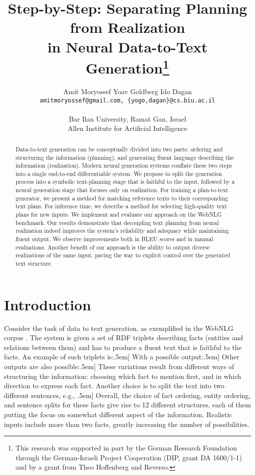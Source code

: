 \documentclass[11pt,a4paper]{article}
\title{
    Step-by-Step: Separating Planning from Realization \\ 
    in Neural Data-to-Text Generation\thanks{\hspace{0.17cm}This research was supported in part by the German Research Foundation through the German-Israeli Project Cooperation (DIP, grant DA 1600/1-1) and by a grant from Theo Hoffenberg and Reverso.}
}
\author{Amit Moryossef \;\; Yoav Goldberg \;\; Ido Dagan \\
\texttt{amitmoryossef@gmail.com, \{yogo,dagan\}@cs.biu.ac.il} \\
\\ Bar Ilan University, Ramat Gan, Israel \\
Allen Institute for Artificial Intelligence
}
\date{}
\begin{document}
\maketitle

\begin{abstract}
Data-to-text generation can be conceptually divided into two parts: ordering and structuring the information (planning), and generating fluent language describing the information (realization). Modern neural generation systems conflate these two steps into a single end-to-end differentiable system. We propose to split the generation process into a symbolic text-planning stage that is faithful to the input, followed by a neural generation stage that focuses only on realization. 
For training a plan-to-text generator, we present a method for matching reference texts to their corresponding text plans. For inference time, we describe a method for selecting high-quality text plans for new inputs. We implement and evaluate our approach on the WebNLG benchmark. Our results demonstrate that decoupling text planning from neural realization indeed improves the system's reliability and adequacy while maintaining fluent output. We observe improvements both in BLEU scores and in manual evaluations. Another benefit of our approach is the ability to output diverse realizations of the same input, paving the way to explicit control over the generated text structure.
\end{abstract}

\thispagestyle{fancy}

\section{Introduction}
Consider the task of data to text generation, as exemplified in the WebNLG corpus \cite{colin2016webnlg}. The system is given a set of RDF triplets describing facts (entities and relations between them) and has to produce a fluent text that is faithful to the facts. An example of such triplets is:\0.5em]
With a possible output:\0.5em]
Other outputs are also possible:\0.5em]
These variations result from different ways of structuring the information: choosing which fact to mention first, and in which direction to express each fact. Another choice is to split the text into two different sentences, e.g., \0.5em]
Overall, the choice of fact ordering, entity ordering, and sentence splits for these facts give rise to 12 different structures, each of them putting the focus on somewhat different aspect of the information. Realistic inputs include more than two facts, greatly increasing the number of possibilities.
\end{document}

